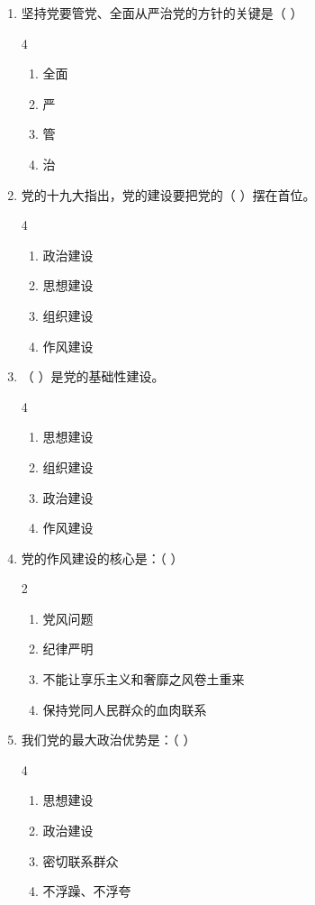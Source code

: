 \documentclass[a4paper,11pt]{ctexart}
\begin{document}
\begin{enumerate}
    \item 坚持党要管党、全面从严治党的方针的关键是（ ）
    \begin{multicols}{4}
    \begin{enumerate}
        \item 全面
        \item 严
        \item 管
        \item 治
    \end{enumerate}
    \end{multicols}

    \item 党的十九大指出，党的建设要把党的（ ）摆在首位。
    \begin{multicols}{4}
    \begin{enumerate}
        \item 政治建设
        \item 思想建设
        \item 组织建设
        \item 作风建设
    \end{enumerate}
    \end{multicols}

    \item （ ）是党的基础性建设。
    \begin{multicols}{4}
    \begin{enumerate}
        \item 思想建设
        \item 组织建设
        \item 政治建设
        \item 作风建设
    \end{enumerate}
    \end{multicols}

    \item 党的作风建设的核心是：（ ）
    \begin{multicols}{2}
    \begin{enumerate}
        \item 党风问题
        \item 纪律严明
        \item 不能让享乐主义和奢靡之风卷土重来
        \item 保持党同人民群众的血肉联系
    \end{enumerate}
    \end{multicols}

    \item 我们党的最大政治优势是：（ ）
    \begin{multicols}{4}
    \begin{enumerate}
        \item 思想建设
        \item 政治建设
        \item 密切联系群众
        \item 不浮躁、不浮夸
    \end{enumerate}
    \end{multicols}


\end{enumerate}
\end{document}
